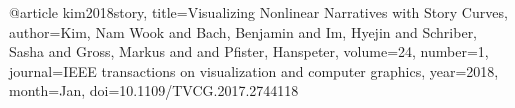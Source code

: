 @article {kim2018story,
    title={Visualizing Nonlinear Narratives with Story Curves},
    author={Kim, Nam Wook and Bach, Benjamin and Im, Hyejin and Schriber, Sasha and Gross, Markus and and Pfister, Hanspeter},
    volume={24},
    number={1},
    journal={IEEE transactions on visualization and computer graphics},
    year={2018},
    month={Jan},
    doi={10.1109/TVCG.2017.2744118}
}
